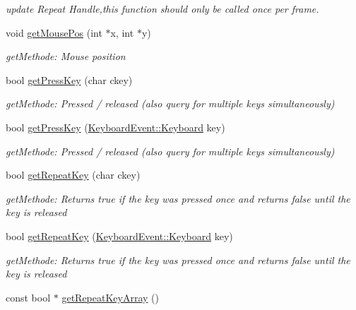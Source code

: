 \begin{DoxyCompactItemize}
\begin{DoxyCompactList}\small\item\em update Repeat Handle,this function should only be called once per frame. \item\end{DoxyCompactList}\item 
void \hyperlink{class_f2_c_1_1_input_afe44e50d55a10eac43f4d114d01fcc9e}{getMousePos} (int $\ast$x, int $\ast$y)
\begin{DoxyCompactList}\small\item\em getMethode: Mouse position \item\end{DoxyCompactList}\item 
bool \hyperlink{class_f2_c_1_1_input_af3d14b1d81e6198c5e0fb5fccbdd0b5c}{getPressKey} (char ckey)
\begin{DoxyCompactList}\small\item\em getMethode: Pressed / released (also query for multiple keys simultaneously) \item\end{DoxyCompactList}\item 
bool \hyperlink{class_f2_c_1_1_input_a5684e139903d71e9a7a0ac6d209895a1}{getPressKey} (\hyperlink{namespace_f2_c_1_1_keyboard_event_a13172bec547dc5eb2eee6c4fcd64c486}{KeyboardEvent::Keyboard} key)
\begin{DoxyCompactList}\small\item\em getMethode: Pressed / released (also query for multiple keys simultaneously) \item\end{DoxyCompactList}\item 
bool \hyperlink{class_f2_c_1_1_input_a5fab8a63b42332d5da2c648654a93f82}{getRepeatKey} (char ckey)
\begin{DoxyCompactList}\small\item\em getMethode: Returns true if the key was pressed once and returns false until the key is released \item\end{DoxyCompactList}\item 
bool \hyperlink{class_f2_c_1_1_input_aba74013667f7cc0ea8d3b53de03262cd}{getRepeatKey} (\hyperlink{namespace_f2_c_1_1_keyboard_event_a13172bec547dc5eb2eee6c4fcd64c486}{KeyboardEvent::Keyboard} key)
\begin{DoxyCompactList}\small\item\em getMethode: Returns true if the key was pressed once and returns false until the key is released \item\end{DoxyCompactList}\item 
\hypertarget{class_f2_c_1_1_input_a033f3bf6ea0c0883b76af3fb9b7f0c05}{
const bool $\ast$ \hyperlink{class_f2_c_1_1_input_a033f3bf6ea0c0883b76af3fb9b7f0c05}{getRepeatKeyArray} ()}
\label{class_f2_c_1_1_input_a033f3bf6ea0c0883b76af3fb9b7f0c05}


\end{DoxyCompactItemize}
